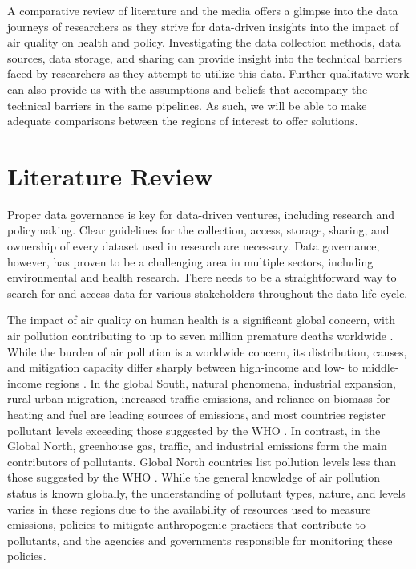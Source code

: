 \documentclass{article}
\begin{document}
A comparative review of literature and the media offers a glimpse into the data journeys of researchers as they strive for data-driven insights into the impact of air quality on health and policy. Investigating the data collection methods, data sources, data storage, and sharing can provide insight into the technical barriers faced by researchers as they attempt to utilize this data. Further qualitative work can also provide us with the assumptions and beliefs that accompany the technical barriers in the same pipelines. As such, we will be able to make adequate comparisons between the regions of interest to offer solutions.    

\section{Literature Review}

Proper data governance is key for data-driven ventures, including research and policymaking. Clear guidelines for the collection, access, storage, sharing, and ownership of every dataset used in research are necessary. Data governance, however, has proven to be a challenging area in multiple sectors, including environmental and health research. There needs to be a straightforward way to search for and access data for various stakeholders throughout the data life cycle.   

The impact of air quality on human health is a significant global concern, with air pollution contributing to up to seven million premature deaths worldwide \cite{fuller_pollution_2022}. While the burden of air pollution is a worldwide concern, its distribution, causes, and mitigation capacity differ sharply between high-income and low- to middle-income regions \cite{jabareen_increasing_2023}. In the global South, natural phenomena, industrial expansion, rural-urban migration, increased traffic emissions, and reliance on biomass for heating and fuel are leading sources of emissions, and most countries register pollutant levels exceeding those suggested by the WHO \cite{kutlar_joss_time_2017}. In contrast, in the Global North, greenhouse gas, traffic, and industrial emissions form the main contributors of pollutants. Global North countries list pollution levels less than those suggested by the WHO \cite{ngui_kenyas_2016}. While the general knowledge of air pollution status is known globally, the understanding of pollutant types, nature, and levels varies in these regions due to the availability of resources used to measure emissions, policies to mitigate anthropogenic practices that contribute to pollutants, and the agencies and governments responsible for monitoring these policies.
\end{document}
